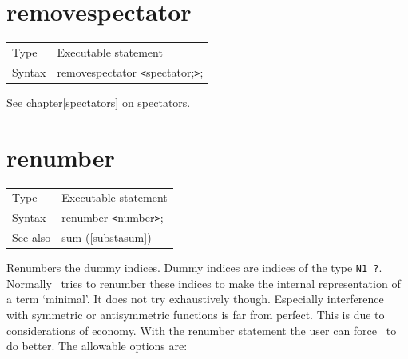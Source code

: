 
\section{removespectator}
\label{substaremovespectator}

\noindent \begin{tabular}{ll}
Type & Executable statement\\
Syntax & removespectator {\tt<}spectator;{\tt>};
\end{tabular} \vspace{4mm}

\noindent See chapter\ref{spectators} on spectators.
\vspace{10mm}


\section{renumber}
\label{substarenumber}

\noindent \begin{tabular}{ll}
Type & Executable statement\\
Syntax & renumber {\tt<}number{\tt>};
\\ See also & sum (\ref{substasum})
\end{tabular}\vspace{4mm}

\noindent Renumbers the dummy 
indices. Dummy indices are indices of the type 
\verb:N1_?:. Normally \FORM\ tries to renumber these indices to make the 
internal representation of a term `minimal'. It does not try exhaustively 
though. Especially interference with symmetric or antisymmetric functions 
is far from perfect. This is due to considerations of economy. With the 
renumber statement the user can force \FORM\ to do better. The allowable 
options are:


\vspace{10mm}

